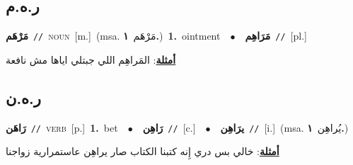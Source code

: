 \documentclass[10pt,a4paper,twoside]{article} %
\begin{document}
\begin{multicols}{2}
\vspace{-3mm}
\subsection*{\color{blue}\foreignlanguage{arabic}{ر.ه.م}\color{blue}{}} 

{\setlength\topsep{0pt}\textbf{\foreignlanguage{arabic}{مَرْهَم}}\ {\color{gray}\texttt{//}\color{black}}\ \textsc{noun}\ [m.]\ \color{gray}(msa. \foreignlanguage{arabic}{مَرْهَم}~\foreignlanguage{arabic}{\textbf{١.}})\color{black}\ \textbf{1.}~ointment\ \ $\bullet$\ \ \setlength\topsep{0pt}\textbf{\foreignlanguage{arabic}{مَرَاهِم}}\ {\color{gray}\texttt{//}\color{black}}\ [pl.]\  \begin{flushright}\color{gray}\foreignlanguage{arabic}{\textbf{\underline{\foreignlanguage{arabic}{أمثلة}}}: المَراهِم اللي جبتلي اياها مش نافعة}\end{flushright}\color{black}} \vspace{2mm}

\vspace{-3mm}
\subsection*{\color{blue}\foreignlanguage{arabic}{ر.ه.ن}\color{blue}{}} 

{\setlength\topsep{0pt}\textbf{\foreignlanguage{arabic}{رَاهَن}}\ {\color{gray}\texttt{//}\color{black}}\ \textsc{verb}\ [p.]\ \textbf{1.}~bet\ \ $\bullet$\ \ \setlength\topsep{0pt}\textbf{\foreignlanguage{arabic}{رَاهِن}}\ {\color{gray}\texttt{//}\color{black}}\ [c.]\ \ $\bullet$\ \ \setlength\topsep{0pt}\textbf{\foreignlanguage{arabic}{يرَاهِن}}\ {\color{gray}\texttt{//}\color{black}}\ [i.]\ \color{gray}(msa. \foreignlanguage{arabic}{يُراهِن}~\foreignlanguage{arabic}{\textbf{١.}})\color{black}\  \begin{flushright}\color{gray}\foreignlanguage{arabic}{\textbf{\underline{\foreignlanguage{arabic}{أمثلة}}}: خالي بس دري إِنه كتبنا الكتاب صار يراهِن عاستمرارية زواجنا}\end{flushright}\color{black}} \vspace{2mm}


\end{multicols}
\end{document}
